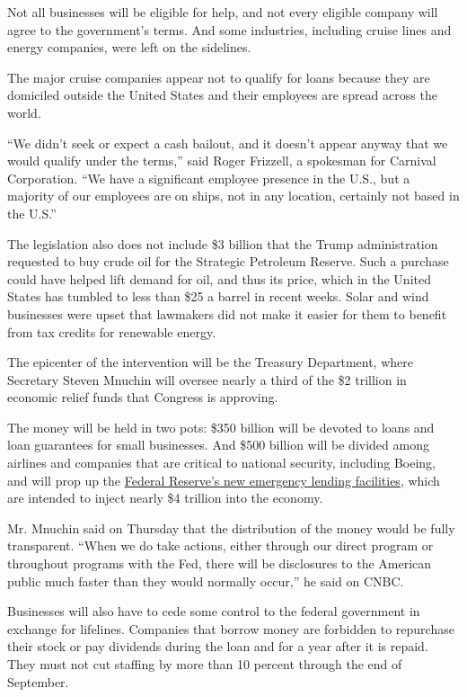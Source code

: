 Not all businesses will be eligible for help, and not every eligible
company will agree to the government's terms. And some industries,
including cruise lines and energy companies, were left on the sidelines.

The major cruise companies appear not to qualify for loans because they
are domiciled outside the United States and their employees are spread
across the world.

``We didn't seek or expect a cash bailout, and it doesn't appear anyway
that we would qualify under the terms,'' said Roger Frizzell, a
spokesman for Carnival Corporation. ``We have a significant employee
presence in the U.S., but a majority of our employees are on ships, not
in any location, certainly not based in the U.S.''

The legislation also does not include \$3 billion that the Trump
administration requested to buy crude oil for the Strategic Petroleum
Reserve. Such a purchase could have helped lift demand for oil, and thus
its price, which in the United States has tumbled to less than \$25 a
barrel in recent weeks. Solar and wind businesses were upset that
lawmakers did not make it easier for them to benefit from tax credits
for renewable energy.

The epicenter of the intervention will be the Treasury Department, where
Secretary Steven Mnuchin will oversee nearly a third of the \$2 trillion
in economic relief funds that Congress is approving.

The money will be held in two pots: \$350 billion will be devoted to
loans and loan guarantees for small businesses. And \$500 billion will
be divided among airlines and companies that are critical to national
security, including Boeing, and will prop up the
\href{https://www.nytimes.com/2020/03/26/business/economy/fed-coronavirus-stimulus.html}{Federal
Reserve's new emergency lending facilities}, which are intended to
inject nearly \$4 trillion into the economy.

Mr. Mnuchin said on Thursday that the distribution of the money would be
fully transparent. ``When we do take actions, either through our direct
program or throughout programs with the Fed, there will be disclosures
to the American public much faster than they would normally occur,'' he
said on CNBC.

Businesses will also have to cede some control to the federal government
in exchange for lifelines. Companies that borrow money are forbidden to
repurchase their stock or pay dividends during the loan and for a year
after it is repaid. They must not cut staffing by more than 10 percent
through the end of September.

